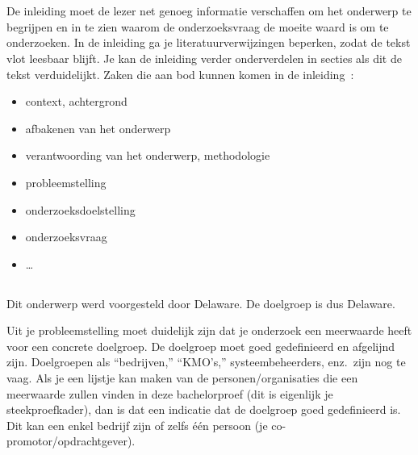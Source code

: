 
\chapter{}
\label{ch:inleiding}

De inleiding moet de lezer net genoeg informatie verschaffen om het onderwerp te begrijpen en in te zien waarom de onderzoeksvraag de moeite waard is om te onderzoeken. In de inleiding ga je literatuurverwijzingen beperken, zodat de tekst vlot leesbaar blijft. Je kan de inleiding verder onderverdelen in secties als dit de tekst verduidelijkt. Zaken die aan bod kunnen komen in de inleiding~\autocite{Pollefliet2011}:

\begin{itemize}
  \item context, achtergrond
  \item afbakenen van het onderwerp
  \item verantwoording van het onderwerp, methodologie
  \item probleemstelling
  \item onderzoeksdoelstelling
  \item onderzoeksvraag
  \item \ldots
\end{itemize}

\section{}
\label{sec:probleemstelling}
Dit onderwerp werd voorgesteld door Delaware. De doelgroep is dus Delaware.

Uit je probleemstelling moet duidelijk zijn dat je onderzoek een meerwaarde heeft voor een concrete doelgroep. De doelgroep moet goed gedefinieerd en afgelijnd zijn. Doelgroepen als ``bedrijven,'' ``KMO's,'' systeembeheerders, enz.~zijn nog te vaag. Als je een lijstje kan maken van de personen/organisaties die een meerwaarde zullen vinden in deze bachelorproef (dit is eigenlijk je steekproefkader), dan is dat een indicatie dat de doelgroep goed gedefinieerd is. Dit kan een enkel bedrijf zijn of zelfs één persoon (je co-promotor/opdrachtgever).

